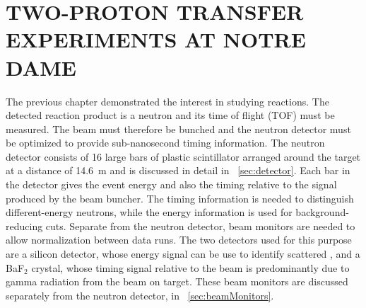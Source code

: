 %
%
%
%
%
%
%
%

%
%

\chapter{TWO-PROTON TRANSFER EXPERIMENTS AT NOTRE DAME}
\label{chap:2pExpt}

The previous chapter demonstrated the interest in studying \reaction reactions.  The detected reaction product is a neutron and its time of flight (TOF) must be measured.  The beam must therefore be bunched and the neutron detector must be optimized to provide sub-nanosecond timing information.  The neutron detector consists of 16 large bars of plastic scintillator arranged around the target at a distance of 14.6~m and is discussed in detail in {\sect}~\ref{sec:detector}.  Each bar in the detector gives the event energy and also the timing relative to the signal produced by the beam buncher.  The timing information is needed to distinguish different-energy neutrons, while the energy information is used for background-reducing cuts.  Separate from the neutron detector, beam monitors are needed to allow normalization between data runs.  The two detectors used for this purpose are a silicon detector, whose energy signal can be use to identify scattered , and a BaF$_2$ crystal, whose timing signal relative to the beam is predominantly due to gamma radiation from the beam on target.  These beam monitors are discussed separately from the neutron detector, in {\sect}~\ref{sec:beamMonitors}. 

